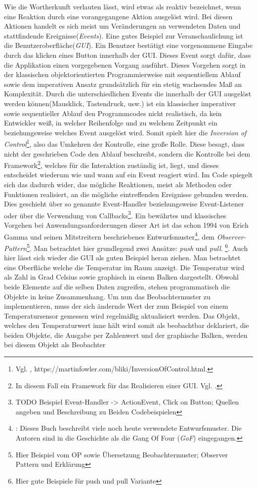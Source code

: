 Wie die Wortherkunft verlauten lässt, wird etwas als reaktiv bezeichnet, wenn eine Reaktion durch eine vorangegangene Aktion ausgelöst wird. Bei diesen Aktionen handelt es sich meist um Veränderungen an verwendeten Daten und stattfindende Ereignisse(\textit{Events}). Eine gutes Beispiel zur Veranschaulichung ist die Benutzeroberfläche(\textit{GUI}). Ein Benutzer bestätigt eine vorgenommene Eingabe durch das klicken eines Button innerhalb der GUI. Dieses Event sorgt dafür, dass die Applikation einen vorgegebenen Vorgang ausführt. Dieses Vorgehen sorgt in der klassischen objektorientierten Programmierweise mit sequentiellem Ablauf sowie dem imperativen Ansatz grundsätzlich für ein stetig wachsendes Maß an Komplexität. Durch die unterschiedlichen Events die innerhalb der GUI ausgelöst werden können(Mausklick, Tastendruck, usw.) ist ein klassischer imperativer sowie sequentieller Ablauf den Programmcodes nicht realistisch, da kein Entwickler weiß, in welcher Reihenfolge und zu welchem Zeitpunkt ein beziehungsweise welches Event ausgelöst wird. Somit spielt hier die \textit{Inversion of Control}\footnote{Vgl. \cite{MartinFowler.2005}, https://martinfowler.com/bliki/InversionOfControl.html.}, also das Umkehren der Kontrolle, eine große Rolle. Diese besagt, dass nicht der geschrieben Code den Ablauf beschreibt, sondern die Kontrolle bei dem Framework\footnote{In diesem Fall ein Framework für das Realisieren einer GUI. Vgl. \cite{wiki.guilist}.}, welches für die Interaktion zuständig ist, liegt, und dieses entscheidet wiederum wie und wann auf ein Event reagiert wird. Im Code spiegelt sich das dadurch wider, das mögliche Reaktionen, meist als Methoden oder Funktionen realisiert, an die mögliche eintreffenden Ereignisse gebunden werden. Dies geschieht über so genannte Event-Handler beziehungsweise Event-Listener oder über die Verwendung von Callbacks\footnote{TODO Beispiel Event-Handler -> ActionEvent, Click on Button; Quellen angeben und Beschreibung zu Beiden Codebeispielen}. Ein bewährtes und klassisches Vorgehen bei Anwendungsanforderungen dieser Art ist das schon 1994 von Erich Gamma und seinen Mitstreitern beschriebenes Entwurfsmuster\footnote{\cite{Gamma.2011}: Dieses Buch beschreibt viele noch heute verwendete Entwurfsmuster. Die Autoren sind in die Geschichte als die Gang Of Four (\textit{GoF}) eingegangen.}, dem \textit{Observer-Pattern}\footnote{Hier Beispiel vom OP sowie Übersetzung Beobachtermuster; Observer Pattern und Erklärung}. Man betrachtet hier grundlegend zwei Ansätze: \textit{push}  und \textit{pull}. \footnote{Hier gute Beispiele für push und pull Variante}. Auch hier lässt sich wieder die GUI als guten Beispiel heran ziehen. Man betrachtet eine Oberfläche welche die Temperatur im Raum anzeigt. Die Temperatur wird als Zahl in Grad Celsius sowie graphisch in einem Balken dargestellt. Obwohl beide Elemente auf die selben Daten zugreifen, stehen programmatisch die Objekte in keine Zusammenhang. Um nun das Beobachtermuster zu implementieren, muss der sich ändernde Wert der zum Beispiel von einem Temperatursensor gemessen wird regelmäßig aktualisiert werden. Das Objekt, welches den Temperaturwert inne hält wird somit als beobachtbar deklariert, die beiden Objekte, die Ausgabe per Zahlenwert und der graphische Balken, werden bei diesem Objekt als Beobachter 